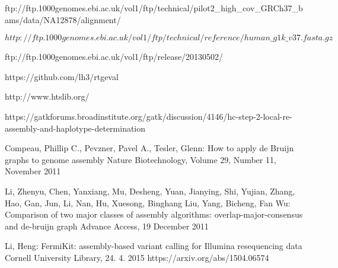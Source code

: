 


\renewcommand{\bibname}{References}

% 


\begin{thebibliography}{99}

 ftp://ftp.1000genomes.ebi.ac.uk/vol1/ftp/technical/pilot2\_high\_cov\_GRCh37\_bams/data/NA12878/alignment/

$http://ftp.1000genomes.ebi.ac.uk/vol1/ftp/technical/reference/human\_g1k\_v37.fasta.gz$

ftp://ftp.1000genomes.ebi.ac.uk/vol1/ftp/release/20130502/

https://github.com/lh3/rtgeval

http://www.htslib.org/

https://gatkforums.broadinstitute.org/gatk/discussion/4146/hc-step-2-local-re-assembly-and-haplotype-determination

Compeau, Phillip C., Pevzner, Pavel A., Tesler, Glenn:
How to apply de Bruijn graphs to genome assembly
Nature Biotechnology, Volume 29, Number 11, November 2011

Li, Zhenyu, Chen, Yanxiang, Mu, Desheng, Yuan, Jianying, Shi, Yujian, Zhang, Hao, Gan, Jun, Li, Nan, Hu, Xuesong, Binghang Liu, Yang, Bicheng, Fan Wu:
Comparison of two major classes of assembly algorithms: overlap-major-consensus and de-bruijn graph
Advance Access, 19 December 2011

Li, Heng: FermiKit: assembly-based variant calling for Illumina resequencing data
Cornell University Library, 24. 4. 2015
https://arxiv.org/abs/1504.06574

\end{thebibliography}
